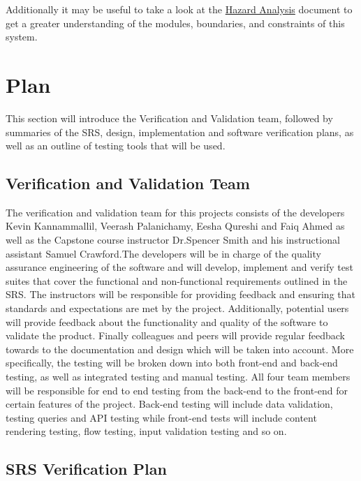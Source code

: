 \documentclass[12pt, titlepage]{article}
\begin{document}
	Additionally it may be useful to take a look at the \href{https://github.com/RutheniumVI/UnderTree/blob/main/docs/HazardAnalysis/HazardAnalysis.pdf}{Hazard Analysis} document to get a greater understanding of the modules, boundaries, and constraints of this system.
	
	\section{Plan}
	
	This section will introduce the Verification and Validation team, followed by summaries of the SRS, design, implementation and software verification plans, as well as an outline of testing tools that will be used.
	
	\subsection{Verification and Validation Team}
	
	The verification and validation team for this projects consists of the developers Kevin Kannammallil, Veerash Palanichamy, Eesha Qureshi and Faiq Ahmed as well as the Capstone course instructor Dr.Spencer Smith and his instructional assistant Samuel Crawford.The developers will be in charge of the quality assurance engineering of the software and will develop, implement and verify test suites that cover the functional and non-functional requirements outlined in the SRS. The instructors will be responsible for providing feedback and ensuring that standards and expectations are met by the project. Additionally, potential users will provide feedback about the functionality and quality of the software to validate the product. Finally colleagues and peers will provide regular feedback towards to the documentation and design which will be taken into account.  More specifically, the testing will be broken down into both front-end and back-end testing, as well as integrated testing and manual testing. All four team members will be responsible for end to end testing from the back-end to the front-end for certain features of the project. Back-end testing will include data validation, testing queries and API testing while front-end tests will include content rendering testing, flow testing, input validation testing and so on. 
	
	\subsection{SRS Verification Plan}
	
\end{document}
